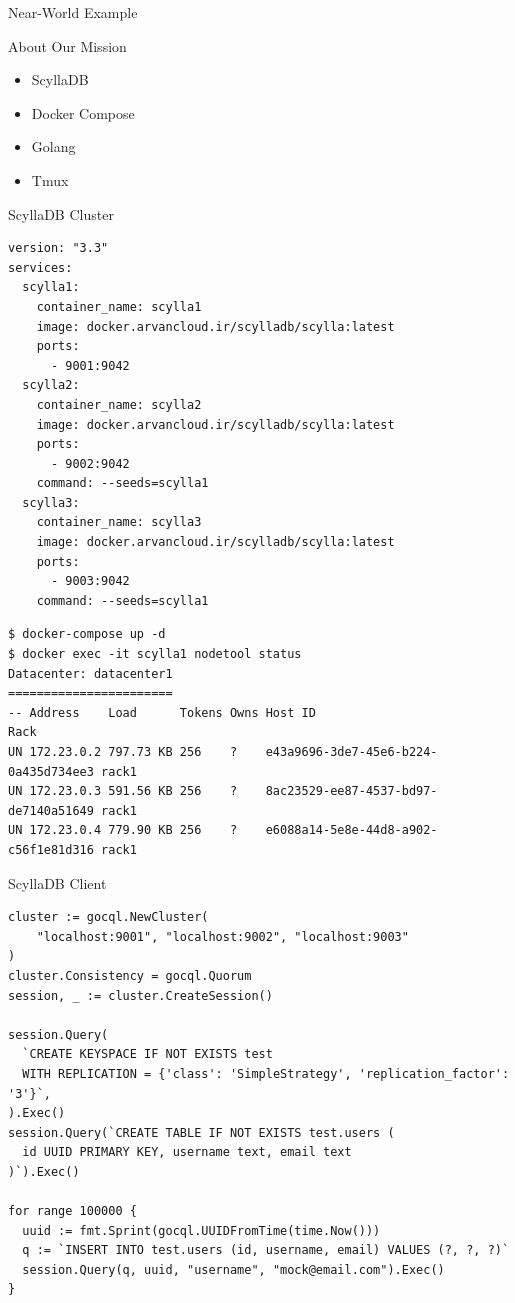 \documentclass[xcolor={rgb}]{beamer}
\newcommand{\pitem}{\pause\item}
\begin{document}
	\begin{frame}[plain,c]
		\begin{center}
		\Huge Near-World Example
		\end{center}
	\end{frame}

	\begin{frame}{About Our Mission}
		\begin{itemize}
			\pitem ScyllaDB
			\pitem Docker Compose
			\pitem Golang
			\pitem Tmux
		\end{itemize}
	\end{frame}

	\begin{frame}[fragile]{ScyllaDB Cluster}
		\begin{verbatim}
version: "3.3"
services:
  scylla1:
    container_name: scylla1
    image: docker.arvancloud.ir/scylladb/scylla:latest
    ports:
      - 9001:9042
  scylla2:
    container_name: scylla2
    image: docker.arvancloud.ir/scylladb/scylla:latest
    ports:
      - 9002:9042
    command: --seeds=scylla1
  scylla3:
    container_name: scylla3
    image: docker.arvancloud.ir/scylladb/scylla:latest
    ports:
      - 9003:9042
    command: --seeds=scylla1
		\end{verbatim}

		\pause
		\begin{verbatim}
$ docker-compose up -d
$ docker exec -it scylla1 nodetool status
Datacenter: datacenter1
=======================
-- Address    Load      Tokens Owns Host ID                              Rack 
UN 172.23.0.2 797.73 KB 256    ?    e43a9696-3de7-45e6-b224-0a435d734ee3 rack1
UN 172.23.0.3 591.56 KB 256    ?    8ac23529-ee87-4537-bd97-de7140a51649 rack1
UN 172.23.0.4 779.90 KB 256    ?    e6088a14-5e8e-44d8-a902-c56f1e81d316 rack1
		\end{verbatim}
	\end{frame}

	\begin{frame}[fragile]{ScyllaDB Client}
		\begin{verbatim}
cluster := gocql.NewCluster(
	"localhost:9001", "localhost:9002", "localhost:9003"
)
cluster.Consistency = gocql.Quorum
session, _ := cluster.CreateSession()

session.Query(
  `CREATE KEYSPACE IF NOT EXISTS test
  WITH REPLICATION = {'class': 'SimpleStrategy', 'replication_factor': '3'}`,
).Exec()
session.Query(`CREATE TABLE IF NOT EXISTS test.users (
  id UUID PRIMARY KEY, username text, email text
)`).Exec()

for range 100000 {
  uuid := fmt.Sprint(gocql.UUIDFromTime(time.Now()))
  q := `INSERT INTO test.users (id, username, email) VALUES (?, ?, ?)`
  session.Query(q, uuid, "username", "mock@email.com").Exec()
}
		\end{verbatim}
	\end{frame}
\end{document}
